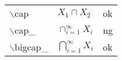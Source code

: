 \documentclass[preview]{standalone}
\newcommand{\tA}[1]{\textcolor{cA}{#1}}
\newcommand{\tD}[1]{\textcolor{cD}{#1}}
\begin{document}
\begin{table}[h]
    \centering
    \begin{tabular}{lll}
        $\backslash$cap      & $X_1 \cap X_2$               & \tA{ok} \\
        $\backslash$cap\_    & $\cap_{i=1}^{\infty} X_i$    & \tD{ng} \\
        $\backslash$bigcap\_ & $\bigcap_{i=1}^{\infty} X_i$ & \tA{ok} \\
    \end{tabular}
\end{table}
\end{document}
